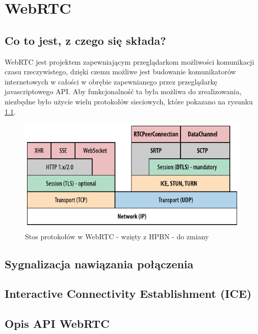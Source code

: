 
\chapter{WebRTC}

\section{Co to jest, z czego się składa?}

\cite{hpbn}

WebRTC jest projektem zapewniającym przeglądarkom możliwości komunikacji czasu rzeczywistego, dzięki czemu możliwe jest
budowanie komunikatorów internetowych w całości w obrębie zapewnianego przez przeglądarkę javascriptowego API. Aby
funkcjonalność ta była możliwa do zrealizowania, niezbędne było użycie wielu protokołów sieciowych, które pokazano
na rysunku \ref{fig:webrtc_stack}.

\begin{figure}[htbp]
	\centering
	\includegraphics{img/webrtc-stack_hpbn}
	\caption{Stos protokołów w WebRTC - wzięty z HPBN - do zmiany}
	\label{fig:webrtc_stack}
\end{figure}

\section{Sygnalizacja nawiązania połączenia}


\section{Interactive Connectivity Establishment (ICE)}

\section{Opis API WebRTC}

